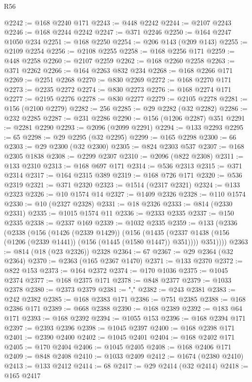 \begin{lexlean}{R56}
\begin{coremodule}
{{{{{{{{{{{{{{{{{{{{{{{{{{{{{{{{{{{{{{{{{{{{{{{{{{{{{{{{{{{{{{{{{{{{{{{{{{{{{{{{{{{{{{{{{{{{{{{{{{{{{{{{{{{{{{{{{{{{{{{{{{{{{{{{{{{{{{{{{{{{{{{{{{{{{{{{{{{{{{{{{{{{{{{{{{{{{{{{{{{{{{{{{{{{{{{{{{{{{{{{{{{{{{{{{{{@2242 := @168 @2240 @171
@2243 := @448 @2242
@2244 := @2107 @2243
@2246 := @168 @2244 @2242
@2247 := @371 @2246
@2250 := @164 @2247 @1050 @234
@2251 := @168 @2250
@2254 := @206 @143 (@209 @143)
@2255 := @2109 @2254
@2256 := @2108 @2255
@2258 := @168 @2256 @171
@2259 := @448 @2258
@2260 := @2107 @2259
@2262 := @168 @2260 @2258
@2263 := @371 @2262
@2266 := @164 @2263 @832 @234
@2268 := @168 @2266 @171
@2269 := @2251 @2268
@2270 := @830 @2269
@2272 := @168 @2270 @171
@2273 := @2235 @2272
@2274 := @830 @2273
@2276 := @168 @2274 @171
@2277 := @2195 @2276
@2278 := @830 @2277
@2279 := @2105 @2278
@2281 := @156 (@2100 @2279)
@2282 := 256
@2285 := @29 @2282 (@32 @2282)
@2286 := @232 @2285
@2287 := @231 @2286
@2290 := @156 (@1206 @2287) @351
@2291 := @2281 @2290
@2293 := @2096 (@2099 @2291)
@2294 := @133 @2293
@2295 := 65
@2298 := @29 @2295 (@32 @2295)
@2299 := @165 @2298
@2300 := 66
@2303 := @29 @2300 (@32 @2300)
@2305 := @824 @2303 @537
@2307 := @168 @2305 @1838
@2308 := @2299 @2307
@2310 := @2096 (@822 @2308)
@2311 := @133 @2310
@2313 := @168 @697 @171
@2314 := @536 @2313
@2315 := @371 @2314
@2317 := @164 @2315 @389
@2319 := @168 @726 @171
@2320 := @536 @2319
@2321 := @371 @2320
@2323 := @1514 (@2317 @2321)
@2324 := @133 @2323
@2326 := @10 @1574 @14
@2327 := @1409 @2326
@2328 := @110 @1574
@2330 := @10 (@2327 @2328)
@2331 := @18 @2326
@2333 := @814 (@2330 @2331)
@2335 := @1015 @1574 @11
@2336 := @2333 @2335
@2337 := @150 @2335
@2338 := @2337 @169
@2339 := @1032 @2335
@2359 := @133
    (@2336
      (@2338
        (@156
          (@1426 (@2339 @1429))
          (@156
            (@1435 (@2337 @1438 (@156 (@1206 (@2339 @1441)) (@156 (@1445 (@1580 @1447)) @351))))
            @351))))
@2363 := @814 (@18 (@23 @2326)) @2328
@2364 := 67
@2367 := @29 @2364 (@32 @2364)
@2370 := @2363 (@165 @2367 @1470)
@2371 := @133 @2370
@2372 := @822 @153
@2373 := @164 @2372
@2374 := @170 @1036
@2375 := @1045 @2374
@2377 := @168 @2375 @171
@2378 := @848 @2377
@2379 := @1033 @2378
@2380 := @2373 @2379
@2381 := ","
@2382 := @243 @2381
@2383 := @242 @2382
@2385 := @168 @2383 @171
@2386 := @751 @2385
@2388 := @168 @2386 @171
@2389 := @668 @2388
@2390 := @168 @2389
@2392 := @183 @64 @171
@2393 := @168 @2392
@2394 := @1055 @153
@2396 := @168 @2394 @171
@2397 := @2393 @2396
@2398 := @1045 @2397
@2400 := @168 @2398 @171
@2401 := @2390 @2400
@2402 := @1045 @2401
@2404 := @168 @2402 @171
@2405 := @170 @2404
@2406 := @1045 @2405
@2408 := @168 @2406 @171
@2409 := @848 @2408
@2410 := @1033 @2409
@2412 := @1674 (@2380 @2410)
@2413 := @133 @2412
@2414 := 68
@2417 := @29 @2414 (@32 @2414)
@2418 := @165 @2417
}}}}}}}}}}}}}}}}}}}}}}}}}}}}}}}}}}}}}}}}}}}}}}}}}}}}}}}}}}}}}}}}}}}}}}}}}}}}}}}}}}}}}}}}}}}}}}}}}}}}}}}}}}}}}}}}}}}}}}}}}}}}}}}}}}}}}}}}}}}}}}}}}}}}}}}}}}}}}}}}}}}}}}}}}}}}}}}}}}}}}}}}}}}}}}}}}}}}}}}}}}}}}}}}}}}
\end{coremodule}
\end{lexlean}
